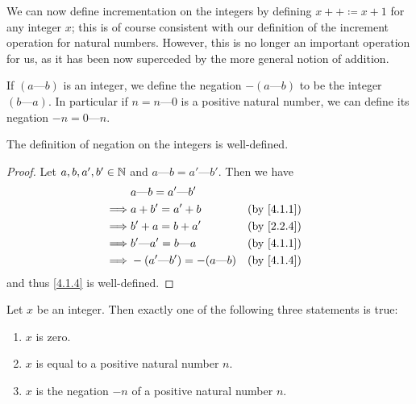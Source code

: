 \begin{note}
  We can now define incrementation on the integers by defining \(x++ \coloneqq x + 1\) for any integer \(x\);
  this is of course consistent with our definition of the increment operation for natural numbers.
  However, this is no longer an important operation for us, as it has been now superceded by the more general notion of addition.
\end{note}

\begin{defn}\label{4.1.4}
  If \((a \text{---} b)\) is an integer, we define the negation \(-(a \text{---} b)\) to be the integer \((b \text{---} a)\).
  In particular if \(n = n \text{---} 0\) is a positive natural number, we can define its negation \(-n = 0 \text{---} n\).
\end{defn}

\begin{ac}\label{ac:4.1.2}
  The definition of negation on the integers is well-defined.
\end{ac}

\begin{proof}
  Let \(a, b, a', b' \in \mathbb{N}\) and \(a \text{---} b = a' \text{---} b'\).
  Then we have
  \begin{align*}
             & a \text{---} b = a' \text{---} b'                       \\
    \implies & a + b' = a' + b                         &  & \by{4.1.1} \\
    \implies & b' + a = b + a'                         &  & \by{2.2.4} \\
    \implies & b' \text{---} a' = b \text{---} a       &  & \by{4.1.1} \\
    \implies & -(a' \text{---} b') = -(a \text{---} b) &  & \by{4.1.4} \\
  \end{align*}
  and thus \cref{4.1.4} is well-defined.
\end{proof}

\begin{lem}\label{4.1.5}
  Let \(x\) be an integer.
  Then exactly one of the following three statements is true:
  \begin{enumerate}
    \item \(x\) is zero.
    \item \(x\) is equal to a positive natural number \(n\).
    \item \(x\) is the negation \(-n\) of a positive natural number \(n\).
  \end{enumerate}
\end{lem}

